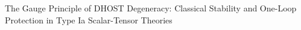 \documentclass[twocolumn]{aastex631}
\begin{document}
The Gauge Principle of DHOST Degeneracy: Classical Stability and One-Loop Protection in Type Ia Scalar-Tensor Theories
\end{document}
